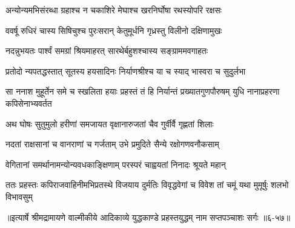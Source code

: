 \twolineshloka
{अन्योन्यमभिसंरब्धा ग्रहाश्च न चकाशिरे}
{मेघाश्च खरनिर्घोषा रथस्योपरि रक्षसः} %

\twolineshloka
{ववर्षू रुधिरं चास्य सिषिचुश्च पुरःसरान्}
{केतुमूर्धनि गृध्रस्तु विलीनो दक्षिणामुखः} %

\twolineshloka
{नदन्नुभयतः पार्श्वं समग्रां श्रियमाहरत्}
{सारथेर्बहुशश्चास्य सङ्ग्राममवगाहतः} %

\twolineshloka
{प्रतोदो न्यपतद्धस्तात् सूतस्य हयसादिनः}
{निर्याणश्रीश्च या च स्याद् भास्वरा च सुदुर्लभा} %

\threelineshloka
{सा ननाश मुहूर्तेन समे च स्खलिता हयाः}
{प्रहस्तं तं हि निर्यान्तं प्रख्यातगुणपौरुषम्}
{युधि नानाप्रहरणा कपिसेनाभ्यवर्तत} %

\twolineshloka
{अथ घोषः सुतुमुलो हरीणां समजायत}
{वृक्षानारुजतां चैव गुर्वीर्वै गृह्णतां शिलाः} %

\twolineshloka
{नदतां राक्षसानां च वानराणां च गर्जताम्}
{उभे प्रमुदिते सैन्ये रक्षोगणवनौकसाम्} %

\twolineshloka
{वेगितानां समर्थानामन्योन्यवधकाङ्क्षिणाम्}
{परस्परं चाह्वयतां निनादः श्रूयते महान्} %

\twolineshloka
{ततः प्रहस्तः कपिराजवाहिनीमभिप्रतस्थे विजयाय दुर्मतिः}
{विवृद्धवेगां च विवेश तां चमूं यथा मुमूर्षुः शलभो विभावसुम्} %


॥इत्यार्षे श्रीमद्रामायणे वाल्मीकीये आदिकाव्ये युद्धकाण्डे प्रहस्तयुद्धम् नाम सप्तपञ्चाशः सर्गः ॥६-५७॥
